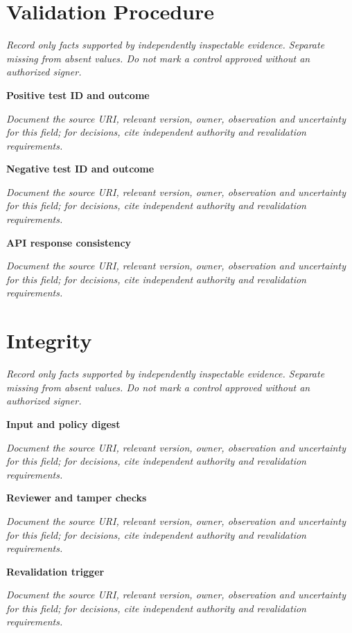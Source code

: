 \documentclass[11pt,letterpaper]{article}
\begin{document}
\section{Validation Procedure}
\noindent\emph{Record only facts supported by independently inspectable evidence. Separate missing from absent values. Do not mark a control approved without an authorized signer.}\par
\noindent\textbf{Positive test ID and outcome}\par
\noindent\emph{Document the source URI, relevant version, owner, observation and uncertainty for this field; for decisions, cite independent authority and revalidation requirements.}\par\medskip
\noindent\textbf{Negative test ID and outcome}\par
\noindent\emph{Document the source URI, relevant version, owner, observation and uncertainty for this field; for decisions, cite independent authority and revalidation requirements.}\par\medskip
\noindent\textbf{API response consistency}\par
\noindent\emph{Document the source URI, relevant version, owner, observation and uncertainty for this field; for decisions, cite independent authority and revalidation requirements.}\par\medskip
\section{Integrity}
\noindent\emph{Record only facts supported by independently inspectable evidence. Separate missing from absent values. Do not mark a control approved without an authorized signer.}\par
\noindent\textbf{Input and policy digest}\par
\noindent\emph{Document the source URI, relevant version, owner, observation and uncertainty for this field; for decisions, cite independent authority and revalidation requirements.}\par\medskip
\noindent\textbf{Reviewer and tamper checks}\par
\noindent\emph{Document the source URI, relevant version, owner, observation and uncertainty for this field; for decisions, cite independent authority and revalidation requirements.}\par\medskip
\noindent\textbf{Revalidation trigger}\par
\noindent\emph{Document the source URI, relevant version, owner, observation and uncertainty for this field; for decisions, cite independent authority and revalidation requirements.}\par\medskip
\end{document}
